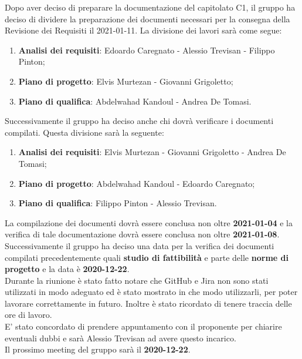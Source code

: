 Dopo aver deciso di preparare la documentazione del capitolato C1, il gruppo ha deciso di dividere la preparazione dei documenti necessari per la consegna della Revisione dei Requisiti il 2021-01-11. La divisione dei lavori sarà come segue:
\begin{enumerate}
\item \textbf{Analisi dei requisiti}: Edoardo Caregnato - Alessio Trevisan - Filippo Pinton;
\item \textbf{Piano di progetto}: Elvis Murtezan - Giovanni Grigoletto;
\item \textbf{Piano di qualifica}: Abdelwahad Kandoul - Andrea De Tomasi.
\end{enumerate}
Successivamente il gruppo ha deciso anche chi dovrà verificare i documenti compilati. Questa divisione sarà la seguente:
\begin{enumerate}
\item \textbf{Analisi dei requisiti}: Elvis Murtezan - Giovanni Grigoletto - Andrea De Tomasi;
\item \textbf{Piano di progetto}: Abdelwahad Kandoul - Edoardo Caregnato;
\item \textbf{Piano di qualifica}: Filippo Pinton - Alessio Trevisan.
\end{enumerate}
La compilazione dei documenti dovrà essere conclusa non oltre \textbf{2021-01-04} e la verifica di tale documentazione dovrà essere conclusa non oltre  \textbf{2021-01-08}.\\
Successivamente il gruppo ha deciso una data per la verifica dei documenti compilati precedentemente quali \textbf{studio di fattibilità} e parte delle \textbf{norme di progetto} e la data è \textbf{2020-12-22}.\\
Durante la riunione \`{e} stato fatto notare che GitHub e Jira non sono stati utilizzati in modo adeguato ed \`{e} stato mostrato in che modo utilizzarli, per poter lavorare correttamente in futuro. Inoltre \`{e} stato ricordato di tenere traccia delle ore di lavoro. \\
E' stato concordato di prendere appuntamento con il proponente per chiarire eventuali dubbi e sarà Alessio Trevisan ad avere questo incarico. \\ 
Il prossimo meeting del gruppo sarà il \textbf{2020-12-22}.


